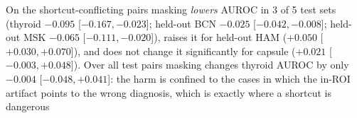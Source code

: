 On the shortcut-conflicting pairs masking \emph{lowers} AUROC in 3 of 5 test sets (thyroid $-0.095$ [$-0.167, -0.023$]; held-out BCN $-0.025$ [$-0.042, -0.008$]; held-out MSK $-0.065$ [$-0.111, -0.020$]), raises it for held-out HAM ($+0.050$ [$+0.030, +0.070$]), and does not change it significantly for capsule ($+0.021$ [$-0.003, +0.048$]). Over all test pairs masking changes thyroid AUROC by only $-0.004$ [$-0.048, +0.041$]: the harm is confined to the cases in which the in-ROI artifact points to the wrong diagnosis, which is exactly where a shortcut is dangerous%

